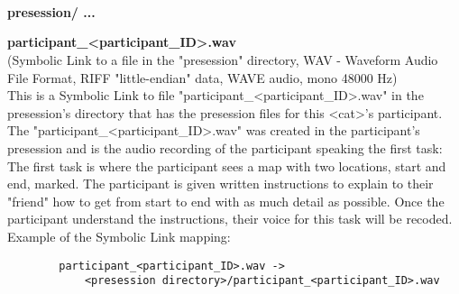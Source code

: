 \begin{description}
\begin{addmargin}[0em]{0em}
\end{addmargin} %


\textbf{\\\\\\}
\begin{addmargin}[0em]{0em} %
    \textbf{presession/ ... }

    \begin{addmargin}[1em]{0em} %
        \label{participant_<participant_ID>.wav}
        \textbf{participant\_<participant\_ID>.wav}\\
        (Symbolic Link to a file in the "presession" directory,
        WAV - Waveform Audio File Format, RIFF "little-endian" data, WAVE audio, mono 48000 Hz)\\
        This is a Symbolic Link to file "participant\_<participant\_ID>.wav" in the presession's directory
        that has the presession files for this <cat>'s participant.\\
        The "participant\_<participant\_ID>.wav" was created in the participant's presession and is the audio recording
        of the participant speaking the first task:\\
        The first task is where the participant sees a map with two locations, start and end, marked.
        The participant is given written instructions to explain to their "friend" how to get from start to end
        with as much detail as possible. Once the participant understand the instructions, their voice for this task will be recoded.\\ 
        Example of the Symbolic Link mapping:
        \begin{verbatim}
        participant_<participant_ID>.wav ->
            <presession directory>/participant_<participant_ID>.wav
            \end{verbatim}  
        \end{addmargin} %


\end{addmargin}
\end{description}
